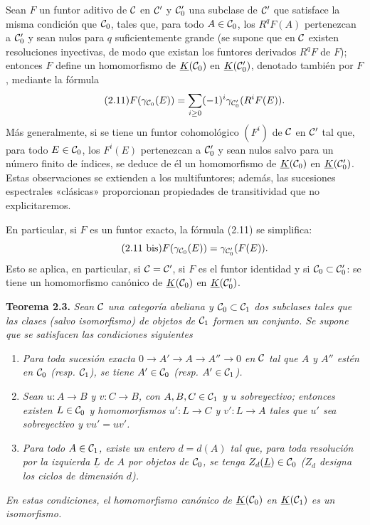 Sean $F$ un funtor aditivo de $\mathcal C$ en $\mathcal C'$ y $\mathcal C'_0$ una subclase de $\mathcal C'$ que satisface la misma condición que $\mathcal C_0$, tales que, para todo $A\in\mathcal C_0$, los $R^qF(A)$ pertenezcan a $\mathcal C'_0$ y sean nulos para $q$ suficientemente grande (se supone que en $\mathcal C$ existen resoluciones inyectivas, de modo que existan los funtores derivados $R^qF$ de $F$); entonces $F$ define un homomorfismo de $\underline{K}(\mathcal C_0)$ en $\underline{K}(\mathcal C'_0)$, denotado también por $F$, mediante la fórmula
\begin{equation}\tag{2.11}
 F(\gamma_{\mathcal C_0}(E))=\sum_{i\geq 0}(-1)^i\gamma_{\mathcal C'_0}(R^iF(E)).
\end{equation}
Más generalmente, si se tiene un funtor cohomológico $(F^i)$ de $\mathcal C$ en $\mathcal C'$ tal que, para todo $E\in\mathcal C_0$, los $F^i(E)$ pertenezcan a $\mathcal C'_0$ y sean nulos salvo para un número finito de índices, se deduce de él un homomorfismo de $\underline{K}(\mathcal C_0)$ en $\underline{K}(\mathcal C'_0)$. Estas observaciones se extienden a los multifuntores; además, las sucesiones espectrales «clásicas» proporcionan propiedades de transitividad que no explicitaremos.

En particular, si $F$ es un funtor exacto, la fórmula (2.11) se simplifica:
\begin{equation}\tag{2.11 bis}
 F(\gamma_{\mathcal C_0}(E))=\gamma_{\mathcal C'_0}(F(E)).
\end{equation}
Esto se aplica, en particular, si $\mathcal C=\mathcal C'$, si $F$ es el funtor identidad y si $\mathcal C_0\subset\mathcal C'_0$: se tiene un homomorfismo canónico de $\underline{K}(\mathcal C_0)$ en $\underline{K}(\mathcal C'_0)$.

\textbf{Teorema 2.3.} \emph{Sean $\mathcal C$ una categoría abeliana y $\mathcal C_0\subset\mathcal C_1$ dos subclases tales que las clases (salvo isomorfismo) de objetos de $\mathcal C_1$ formen un conjunto. Se supone que se satisfacen las condiciones siguientes}
\begin{enumerate}[label=(\roman*)]
\item \emph{Para toda sucesión exacta $0\to A'\to A\to A''\to0$ en $\mathcal C$ tal que $A$ y $A''$ estén en $\mathcal C_0$ (resp. $\mathcal C_1$), se tiene $A'\in\mathcal C_0$ (resp. $A'\in\mathcal C_1$).}
\item \emph{Sean $u:A\to B$ y $v:C\to B$, con $A,B,C\in\mathcal C_1$ y $u$ sobreyectivo; entonces existen $L\in\mathcal C_0$ y homomorfismos $u':L\to C$ y $v':L\to A$ tales que $u'$ sea sobreyectivo y $vu'=uv'$.}
\item \emph{Para todo $A\in\mathcal C_1$, existe un entero $d=d(A)$ tal que, para toda resolución por la izquierda $\underline{L}$ de $A$ por objetos de $\mathcal C_0$, se tenga $Z_d(\underline{L})\in\mathcal C_0$ ($Z_d$ designa los ciclos de dimensión $d$).}
\end{enumerate}
\emph{En estas condiciones, el homomorfismo canónico de $\underline{K}(\mathcal C_0)$ en $\underline{K}(\mathcal C_1)$ es un isomorfismo.}

